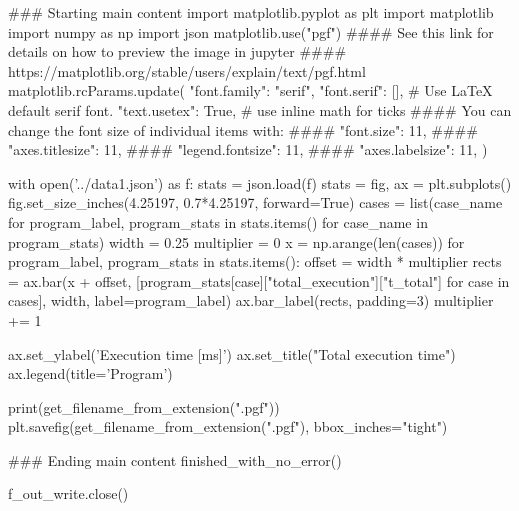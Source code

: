 ### Starting main content
import matplotlib.pyplot as plt
import matplotlib
import numpy as np
import json
matplotlib.use("pgf")
#### See this link for details on how to preview the image in jupyter
#### https://matplotlib.org/stable/users/explain/text/pgf.html
matplotlib.rcParams.update({
  "font.family": "serif",
  "font.serif": [], # Use LaTeX default serif font.
  "text.usetex": True, # use inline math for ticks
  #### You can change the font size of individual items with:
  #### "font.size": 11,
  #### "axes.titlesize": 11,
  #### "legend.fontsize": 11,
  #### "axes.labelsize": 11,
})

with open('../data1.json') as f:
    stats = json.load(f)
stats = {}
fig, ax = plt.subplots()
fig.set_size_inches(4.25197, 0.7*4.25197, forward=True)
cases = list({case_name for program_label, program_stats in stats.items() for case_name in program_stats})
width = 0.25
multiplier = 0
x = np.arange(len(cases))
for program_label, program_stats in stats.items():
    offset = width * multiplier
    rects = ax.bar(x + offset, [program_stats[case]["total_execution"]["t_total"] for case in cases], width, label=program_label)
    ax.bar_label(rects, padding=3)
    multiplier += 1


ax.set_ylabel('Execution time [ms]')
ax.set_title("Total execution time")
ax.legend(title='Program')

print(get_filename_from_extension(".pgf"))
plt.savefig(get_filename_from_extension(".pgf"), bbox_inches="tight")




### Ending main content
finished_with_no_error()


f_out_write.close()




